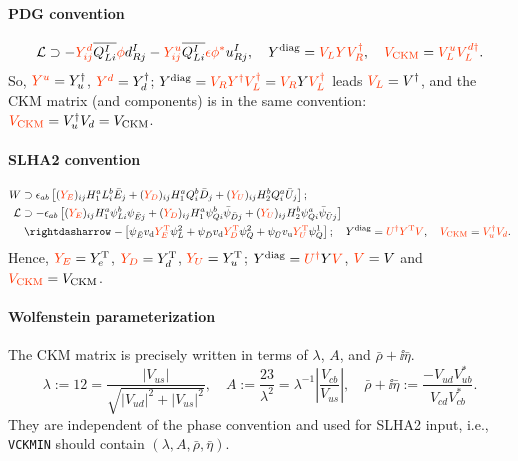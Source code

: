 \documentclass[CheatSheet]{subfiles}
\begin{document}
\paragraph{PDG convention} \cite[\S12]{PDG2018}\cite[\S12]{PDG2020}
\begin{equation}
 \mathcal L \supset
 -\C{Y^d_{ij}}\overline{Q_{Li}^I}\C{\phi} d_{Rj}^I
 -\C{Y^u_{ij}}\overline{Q_{Li}^I}\C{\epsilon\phi^*}u_{Rj}^I,
\quad Y\wdiag = \C{V_L Y V_R^\dagger},
\quad \C{V\w{CKM}} = \C{V^u_LV_L^{d\dagger}}.
\end{equation}
So, $\C{Y^u}=\Yu^\dagger$, $\C{Y^d}=\Yd^\dagger$;
$Y\wdiag = \C{V_RY^\dagger V_L^\dagger} = \C{V_R}Y\C{V_L^\dagger}$ leads $\C{V_L}=V^\dagger$, and the CKM matrix (and components) is in the same convention: $\C{V\w{CKM}}=V_u^\dagger V_d=V\w{CKM}$.


\paragraph{SLHA2 convention} \cite{SLHA2}
\begin{align}
 W &\supset \epsilon_{ab}\left[
(\C{Y_E})_{ij}H_1^a L_i^b \bar E_j
+(\C{Y_D})_{ij}H_1^a Q_i^b \bar D_j
+(\C{Y_U})_{ij}H_2^b Q_i^a \bar U_j
\right];
\\
\mathcal L&\supset
- \epsilon_{ab}\left[
(\C{Y_E})_{ij}H_1^a \psi_{Li}^b \psi_{\bar Ej}
+(\C{Y_D})_{ij}H_1^a \psi_{Qi}^b \bar \psi_{\bar Dj}
+(\C{Y_U})_{ij}H_2^b \psi_{Qi}^a \bar \psi_{\bar Uj}
\right]
\\&\leadsto
- \left[
\psi_{\bar E}\vd \C{Y_E^\TT}\psi_L^2
+\psi_{\bar D}\vd\C{Y_D^\TT}\psi_Q^2
+\psi_{\bar U}\vu\C{Y_U^\TT}\psi_Q^1
\right];
\quad
Y\wdiag = \C{U^\dagger Y^\TT V},
\quad
\C{V\w{CKM}} = \C{V_u^\dagger V_d}.
\end{align}
Hence, $\C{Y_E}=\Ye^\TT$, $\C{Y_D}=\Yd^\TT$, $\C{Y_U}=\Yu^\TT$;
$Y\wdiag=\C{U^\dagger}Y\C{V}$, $\C{V}=V$ and $\C{V\w{CKM}}=V\w{CKM}$.

\paragraph{Wolfenstein parameterization}
The CKM matrix is precisely written in terms of $\lambda$, $A$, and $\bar\rho+\ii\bar\eta$.
\begin{equation}
  \lambda := \si{12} = \frac{|V_{us}|}{\sqrt{|V_{ud}|^2+|V_{us}|^2}},
\quad
  A:=\frac{\si{23}}{\lambda^2}=\lambda^{-1}\left|\frac{V_{cb}}{V_{us}}\right|,
\quad
\bar\rho+\ii\bar\eta:=\frac{-V_{ud}V^*_{ub}}{V_{cd}V^*_{cb}}.
\end{equation}
They are independent of the phase convention and used for SLHA2 input, i.e., \texttt{VCKMIN} should contain $(\lambda, A, \bar\rho, \bar\eta)$.
\end{document}

